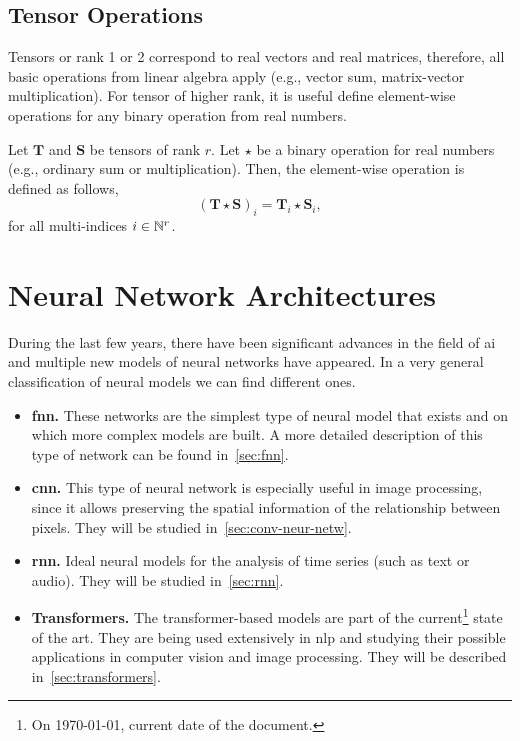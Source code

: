 \subsection{Tensor Operations}

Tensors or rank 1 or 2 correspond to real vectors and real matrices, therefore,
all basic operations from linear algebra apply (e.g., vector sum, matrix-vector
multiplication). For tensor of higher rank, it is useful define element-wise
operations for any binary operation from real numbers.

Let \(\mathbf{T}\) and \(\mathbf{S}\) be tensors of rank \(r\). Let \(\star\)
be a binary operation for real numbers (e.g., ordinary sum or
multiplication). Then, the element-wise operation is defined as follows,
\begin{equation}
  {(\mathbf{T} \star \mathbf{S})}_i = \mathbf{T}_i \star \mathbf{S}_i,
\end{equation}
for all multi-indices \(i \in \mathbb{N}^r\).



\section{Neural Network Architectures}%
\label{sec:nn-architectures}

During the last few years, there have been significant advances in the field of
\gls{ai} and multiple new models of neural networks have appeared. In a very
general classification of neural models we can find different ones.

\begin{itemize}
  \item \textbf{\acl{fnn}.} These networks are the simplest type of neural
  model that exists and on which more complex models are built. A more detailed
  description of this type of network can be found in\ \vref{sec:fnn}.
  \item \textbf{\acl{cnn}.} This type of neural network is especially useful in
  image processing, since it allows preserving the
  spatial information of the relationship between pixels. They will be studied
  in\ \vref{sec:conv-neur-netw}.
  \item \textbf{\acl{rnn}.} Ideal neural models for the analysis of time series
  (such as text or audio). They will be studied in\ \vref{sec:rnn}.
  \item \textbf{Transformers.} The transformer-based models are part of the
  current\footnote{On \today, current date of the document.} state of the art.
  They are being used extensively in \gls{nlp} and studying their possible
  applications in computer vision and image processing. They will be described in\ \vref{sec:transformers}.
\end{itemize}

